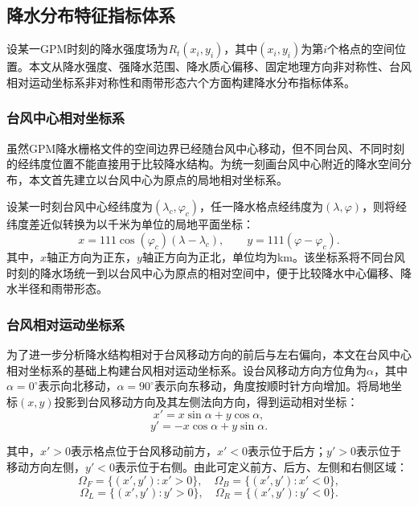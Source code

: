 \documentclass[UTF8,a4paper,zihao=5,fontset=fandol]{ctexart}
\numberwithin{equation}{section}
\numberwithin{figure}{section}
\numberwithin{table}{section}
\begin{document}
\subsection{降水分布特征指标体系}

设某一GPM时刻的降水强度场为$R_t(x_i,y_i)$，其中$(x_i,y_i)$为第$i$个格点的空间位置。本文从降水强度、强降水范围、降水质心偏移、固定地理方向非对称性、台风相对运动坐标系非对称性和雨带形态六个方面构建降水分布指标体系。

\subsubsection{台风中心相对坐标系}

虽然GPM降水栅格文件的空间边界已经随台风中心移动，但不同台风、不同时刻的经纬度位置不能直接用于比较降水结构。为统一刻画台风中心附近的降水空间分布，本文首先建立以台风中心为原点的局地相对坐标系。

设某一时刻台风中心经纬度为$(\lambda_c,\varphi_c)$，任一降水格点经纬度为$(\lambda,\varphi)$，则将经纬度差近似转换为以千米为单位的局地平面坐标：
\begin{equation}
    x=111\cos(\varphi_c)(\lambda-\lambda_c),
    \qquad
    y=111(\varphi-\varphi_c).
\end{equation}
其中，$x$轴正方向为正东，$y$轴正方向为正北，单位均为km。该坐标系将不同台风时刻的降水场统一到以台风中心为原点的相对空间中，便于比较降水中心偏移、降水半径和雨带形态。

\subsubsection{台风相对运动坐标系}

为了进一步分析降水结构相对于台风移动方向的前后与左右偏向，本文在台风中心相对坐标系的基础上构建台风相对运动坐标系。设台风移动方向方位角为$\alpha$，其中$\alpha=0^\circ$表示向北移动，$\alpha=90^\circ$表示向东移动，角度按顺时针方向增加。将局地坐标$(x,y)$投影到台风移动方向及其左侧法向方向，得到运动相对坐标：
\begin{equation}
    x'=x\sin\alpha+y\cos\alpha,
\end{equation}
\begin{equation}
    y'=-x\cos\alpha+y\sin\alpha.
\end{equation}

其中，$x'>0$表示格点位于台风移动前方，$x'<0$表示位于后方；$y'>0$表示位于移动方向左侧，$y'<0$表示位于右侧。由此可定义前方、后方、左侧和右侧区域：
\begin{equation}
    \Omega_F=\{(x',y'):x'>0\},\quad
    \Omega_B=\{(x',y'):x'<0\},
\end{equation}
\begin{equation}
    \Omega_L=\{(x',y'):y'>0\},\quad
    \Omega_R=\{(x',y'):y'<0\}.
\end{equation}
\end{document}
